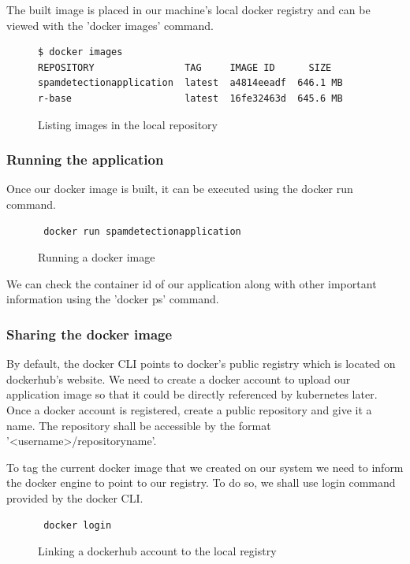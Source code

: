 \documentclass[9pt,twocolumn,twoside]{../../styles/osajnl}
\begin{document}
{\noindent
The built image is placed in our machine's local docker registry and
can be viewed with the 'docker images' command.

\begin{figure}[H]
\begin{verbatim}
$ docker images
REPOSITORY                TAG     IMAGE ID      SIZE
spamdetectionapplication  latest  a4814eeadf  646.1 MB
r-base                    latest  16fe32463d  645.6 MB
\end{verbatim}                   
\caption{Listing images in the local repository}
\label{Listing images in the local repository}
\end{figure}

\subsubsection{Running the application}

\noindent
Once our docker image is built, it can be executed using the docker
run command.

\begin{figure}[H]
\begin{verbatim}
 docker run spamdetectionapplication
\end{verbatim}
\caption{Running a docker image}
\label{Running a docker image}
\end{figure}

\noindent
We can check the container id of our application along with other
important information using the 'docker ps' command.
 
\subsubsection{Sharing the docker image}

By default, the docker CLI points to docker's public registry which is
located on dockerhub's website. We need to create a docker
account to upload our application image so that it could be directly
referenced by kubernetes later. Once a docker account is registered,
create a public repository and give it a name. The repository shall be
accessible by the format '<username>/repositoryname'.

\noindent
To tag the current docker image that we created on our system we need
to inform the docker engine to point to our registry. To do so, we
shall use login command provided by the docker CLI.

\begin{figure}[H]
\begin{verbatim}
 docker login
\end{verbatim}
\caption{Linking a dockerhub account to the local registry}
\label{Linking a dockerhub account to the local registry}
\end{figure}

}
\end{document}
